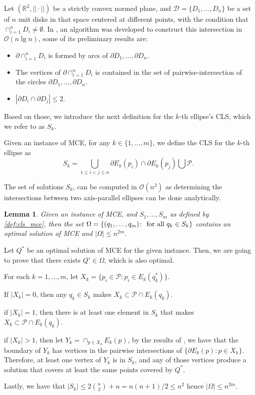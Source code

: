 \documentclass[a4]{elsarticle}
\newcommand{\R}{\mathbb{R}}
\newcommand{\D}{\mathscr{D}}
\newcommand{\Pp}{\mathscr{P}}
\newcommand{\bigO}{\mathscr{O}}
\newtheorem{lem}[thm]{Lemma}
\begin{document}
Let $(\R^2, ||\cdot||)$ be a strictly convex normed plane, and $\D=\{D_1, \dots, D_n\}$ be a set of $n$ unit disks in that space centered at different points, with the condition that  $\cap_{i=1}^n D_i \neq \emptyset$. In \cite{bi}, an algorithm was developed to construct this intersection in $\bigO(n\lg{n})$, some of its preliminary results are:
\begin{itemize}
	\item $\partial \cap_{i=1}^n D_i$ is formed by arcs of $\partial D_1, \dots, \partial D_n$.
	\item The vertices of $\partial \cap_{i=1}^n D_i$ is contained in the set of pairwise-intersection of the circles $\partial D_1, \dots, \partial D_n$.
	\item $|\partial D_i \cap \partial D_j| \le 2$.
\end{itemize}

Based on those, we introduce the next definition for the $k$-th ellipse's CLS, which we refer to as $S_k$.

\begin{definition}\label{def:cls_mce}
	Given an instance of MCE, for any $k \in \{1, \dots, m\}$, we define the CLS for the $k$-th ellipse as
	\begin{equation}
	S_k = \bigcup_{1 \le i < j \le n} \partial E_k(p_i) \cap \partial E_k(p_j) \bigcup \Pp.
	\end{equation}
\end{definition}

The set of solutions $S_k$, can be computed in $\bigO(n^2)$ as determining the intersections between two axis-parallel ellipses can be done analytically. 

\begin{lem}
	Given an instance of MCE, and $S_1, \dots, S_m$ as defined by \autoref{def:cls_mce}, then the set $\Omega = \{(q_1, \dots, q_m) \colon \textnormal{ for all }q_k \in S_k \}$ contains an optimal solution of MCE and $|\Omega| \le n^{2m}$. 
\end{lem}
\begin{pf}
	Let $Q^*$ be an optimal solution of MCE for the given instance. Then, we are going to prove that there exists $Q' \in \Omega$, which is also optimal.
	
	For each $k=1, \dots, m$, let $X_k = \{p_i \in \Pp\colon p_i \in E_k(q_k^*)\}$.
	
	If $|X_k| = 0$, then any $q_k \in S_k$ makes $X_k \subset \Pp \cap E_k(q_k)$.
	
	if $|X_k| = 1$, then there is at least one element in $S_k$ that makes $X_k \subset \Pp \cap E_k(q_k)$.
	
	if $|X_k| > 1$, then let $Y_k = \cap_{p \in X_k}E_k(p)$, by the results of \cite{bi}, we have that the boundary of $Y_k$ has vertices in the pairwise intersections of $\{\partial E_k(p) \colon p \in X_k\}$. Therefore, at least one vertex of $Y_k$ is in $S_k$, and any of those vertices produce a solution that covers at least the same points covered by $Q^*$.
	
	Lastly, we have that $|S_k| \le 2\binom{n}{2} + n = n(n+1)/2 \le n^2$ hence $|\Omega| \le n^{2m}$.
\end{pf}
\end{document}
